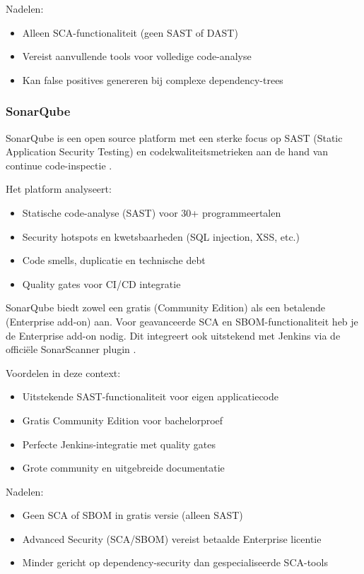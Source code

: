 Nadelen:
\begin{itemize}
  \item Alleen SCA-functionaliteit (geen SAST of DAST)
  \item Vereist aanvullende tools voor volledige code-analyse
  \item Kan false positives genereren bij complexe dependency-trees
\end{itemize}


\subsubsection{SonarQube}
SonarQube is een open source platform met een sterke focus op SAST (Static Application Security Testing) en codekwaliteitsmetrieken aan de hand van continue code-inspectie \autocite{SonarQubeFeatures}.

Het platform analyseert: 
\begin{itemize}
  \item Statische code-analyse (SAST) voor 30+ programmeertalen
  \item Security hotspots en kwetsbaarheden (SQL injection, XSS, etc.)
  \item Code smells, duplicatie en technische debt
  \item Quality gates voor CI/CD integratie
\end{itemize}

SonarQube biedt zowel een gratis (Community Edition) als een betalende (Enterprise add-on) aan. Voor geavanceerde SCA en SBOM-functionaliteit heb je de Enterprise add-on nodig. Dit integreert ook uitstekend met Jenkins via de officiële SonarScanner plugin \autocite{SonarJenkins}.

Voordelen in deze context:
\begin{itemize}
  \item Uitstekende SAST-functionaliteit voor eigen applicatiecode
  \item Gratis Community Edition voor bachelorproef
  \item Perfecte Jenkins-integratie met quality gates
  \item Grote community en uitgebreide documentatie
\end{itemize}

Nadelen:
\begin{itemize}
  \item Geen SCA of SBOM in gratis versie (alleen SAST)
  \item Advanced Security (SCA/SBOM) vereist betaalde Enterprise licentie
  \item Minder gericht op dependency-security dan gespecialiseerde SCA-tools
\end{itemize}

